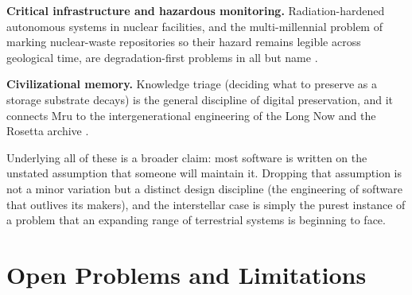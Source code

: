 \documentclass[10pt, a4paper]{article}
\begin{document}
\textbf{Critical infrastructure and hazardous monitoring.} Radiation-hardened autonomous systems in nuclear facilities, and the multi-millennial problem of marking nuclear-waste repositories so their hazard remains legible across geological time, are degradation-first problems in all but name \cite{trauth1993}.

\textbf{Civilizational memory.} Knowledge triage (deciding what to preserve as a storage substrate decays) is the general discipline of digital preservation, and it connects Mru to the intergenerational engineering of the Long Now and the Rosetta archive \cite{brand1999, rosetta}.

Underlying all of these is a broader claim: most software is written on the unstated assumption that someone will maintain it. Dropping that assumption is not a minor variation but a distinct design discipline (the engineering of software that outlives its makers), and the interstellar case is simply the purest instance of a problem that an expanding range of terrestrial systems is beginning to face.

\section{Open Problems and Limitations}
\end{document}

